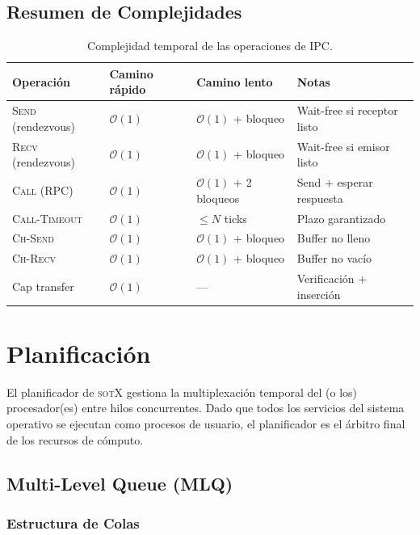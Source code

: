 \documentclass[11pt,twoside,openright]{book}
\theoremstyle{definition}
\theoremstyle{plain}
\theoremstyle{remark}
\newcommand{\sotos}{\textsc{sotX}}
\newcommand{\bigO}{\mathcal{O}}
\begin{document}
\section{Resumen de Complejidades}

\begin{table}[ht]
\centering
\caption{Complejidad temporal de las operaciones de IPC.}
\label{tab:ipc-complexity}
\begin{tabular}{@{}llll@{}}
\toprule
\textbf{Operación} & \textbf{Camino rápido} & \textbf{Camino lento} & \textbf{Notas} \\
\midrule
\textsc{Send} (rendezvous) & $\bigO(1)$ & $\bigO(1)$ + bloqueo & Wait-free si receptor listo \\
\textsc{Recv} (rendezvous) & $\bigO(1)$ & $\bigO(1)$ + bloqueo & Wait-free si emisor listo \\
\textsc{Call} (RPC) & $\bigO(1)$ & $\bigO(1)$ + 2 bloqueos & Send + esperar respuesta \\
\textsc{Call-Timeout} & $\bigO(1)$ & $\leq N$ ticks & Plazo garantizado \\
\textsc{Ch-Send} & $\bigO(1)$ & $\bigO(1)$ + bloqueo & Buffer no lleno \\
\textsc{Ch-Recv} & $\bigO(1)$ & $\bigO(1)$ + bloqueo & Buffer no vacío \\
Cap transfer & $\bigO(1)$ & --- & Verificación + inserción \\
\bottomrule
\end{tabular}
\end{table}


\chapter{Planificación}
\label{chap:scheduling}

El planificador de \sotos{} gestiona la multiplexación temporal del (o los) procesador(es)
entre hilos concurrentes. Dado que todos los servicios del sistema operativo se ejecutan
como procesos de usuario, el planificador es el árbitro final de los recursos de cómputo.

\section{Multi-Level Queue (MLQ)}

\subsection{Estructura de Colas}
\end{document}
